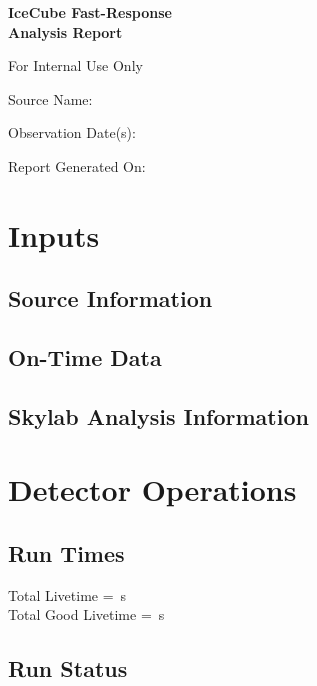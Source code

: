 \documentclass[titlepage]{article}
\begin{document}
\begin{titlepage}
  \centering
  \vspace{4cm}
  {\huge\bfseries IceCube Fast-Response \\ Analysis Report\par}
  \vspace{1cm}
  {\LARGE For Internal Use Only\par}
  \vfill
  {\Large Source Name: \\ \itshape\sourcename\par}
  \vspace{0.5cm}
  {\Large Observation Date(s):\\ \obsdate \par}
  \vfill
  \vspace{1cm} 
  {\Large Report Generated On:\\ \reportdate \par}
\end{titlepage}

\section{Inputs}
\subsection{Source Information}
\sourcetable
\subsection{On-Time Data}
\ontimetable
\subsection{Skylab Analysis Information}
\skylabtable 

\pagebreak
\section{Detector Operations}

\subsection{Run Times}
\runtimetable

Total Livetime = \livetime\,s \\
Total Good Livetime = \goodLivetime\,s

\subsection{Run Status}
\runstatustable
\end{document}
